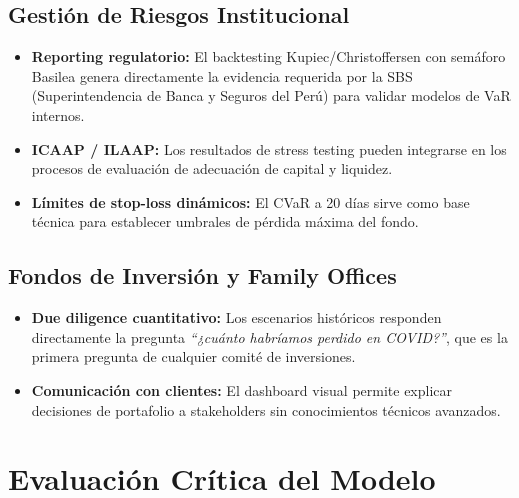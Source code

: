 \documentclass[11pt,a4paper]{article}
\begin{document}
\subsection{Gestión de Riesgos Institucional}

\begin{itemize}[leftmargin=*]
    \item \textbf{Reporting regulatorio:} El backtesting Kupiec/Christoffersen con semáforo
    Basilea genera directamente la evidencia requerida por la SBS (Superintendencia de Banca y
    Seguros del Perú) para validar modelos de VaR internos.
    \item \textbf{ICAAP / ILAAP:} Los resultados de stress testing pueden integrarse en los
    procesos de evaluación de adecuación de capital y liquidez.
    \item \textbf{Límites de stop-loss dinámicos:} El CVaR a 20 días sirve como base técnica
    para establecer umbrales de pérdida máxima del fondo.
\end{itemize}

\subsection{Fondos de Inversión y Family Offices}

\begin{itemize}[leftmargin=*]
    \item \textbf{Due diligence cuantitativo:} Los escenarios históricos responden directamente
    la pregunta \textit{``¿cuánto habríamos perdido en COVID?''}, que es la primera pregunta
    de cualquier comité de inversiones.
    \item \textbf{Comunicación con clientes:} El dashboard visual permite explicar decisiones
    de portafolio a stakeholders sin conocimientos técnicos avanzados.
\end{itemize}

\section{Evaluación Crítica del Modelo}
\end{document}
